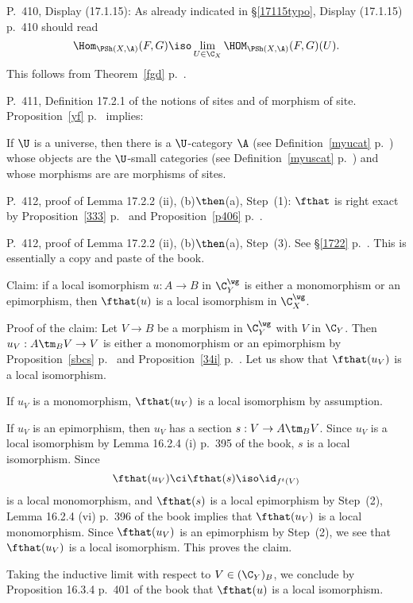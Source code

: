 \documentclass[12pt]{article}
\theoremstyle{remark}
\theoremstyle{definition}
\begin{document}
%

\begin{s}
P.~410, Display (17.1.15): As already indicated in \S\ref{17115typo}, Display (17.1.15) p.~410 should read 
$$
\Hom_{\PSh(X,\A)}(F,G)\iso\lim_{U\in\C_X}\HOM_{\PSh(X,\A)}(F,G)(U).
$$
This follows from Theorem~\ref{fgd} p.~. %
\end{s} 

%

\begin{s}
P.~411, Definition 17.2.1 of the notions of sites and of morphism of site. Proposition~\ref{yf} p.~ implies:

If $\U$ is a universe, then there is a $\U$-category $\A$ (see Definition~\ref{myucat} p.~) whose objects are the $\U$-small categories (see Definition~\ref{myuscat} p.~) and whose morphisms are are morphisms of sites.
\end{s}

%

\begin{s}
P.~412, proof of Lemma 17.2.2 (ii), (b)$\then$(a), Step~(1): $\fthat$ is right exact by Proposition~\ref{333} p.~ and Proposition~\ref{p406} p.~.
\end{s}

%

\begin{s}
P.~412, proof of Lemma 17.2.2 (ii), (b)$\then$(a), Step~(3). See \S\ref{1722} p.~. This is essentially a copy and paste of the book.

Claim: if a local isomorphism $u:A\to B$ in $\C_Y^\wg$ is either a monomorphism or an epimorphism, then $\fthat(u)$ is a local isomorphism in $\C_X^\wg$. 

Proof of the claim: Let $V\to B$ be a morphism in $\C_Y^\wg$ with $V$ in $\C_Y$. Then $u_V: A\tm_BV\to V$ is either a monomorphism or an epimorphism by Proposition~\ref{sbcs} p.~ and Proposition~\ref{34i} p.~. Let us show that $\fthat(u_V)$ is a local isomorphism. 

If $u_V$ is a monomorphism, $\fthat(u_V)$ is a local isomorphism by assumption. 

If $u_V$ is an epimorphism, then $u_V$ has a section $s:V\to A\tm_BV$. Since $u_V$ is a local isomorphism by Lemma 16.2.4 (i) p.~395 of the book, $s$ is a local isomorphism. Since 
$$
\fthat(u_V)\ci\fthat(s)\iso\id_{f^t(V)}
$$ 
is a local monomorphism, and $\fthat(s)$ is a local epimorphism by Step~(2), Lemma 16.2.4 (vi) p.~396 of the book implies that $\fthat(u_V)$ is a local monomorphism. Since $\fthat(u_V)$ is an epimorphism by Step~(2), we see that $\fthat(u_V)$ is a local isomorphism. This proves the claim.

Taking the inductive limit with respect to $V\in(\C_Y)_B$, we conclude by Proposition 16.3.4 p.~401 of the book that $\fthat(u)$ is a local isomorphism.
\end{s}
\end{document}
